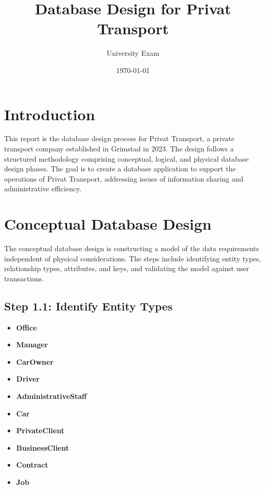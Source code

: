 \documentclass[a4paper,12pt]{article}
\title{Database Design for Privat Transport}
\author{University Exam}
\date{\today}
\begin{document}
\maketitle

\section*{Introduction}
This report is the database design process for Privat Transport, a private transport company established in Grimstad in 2023. The design follows a structured methodology comprising conceptual, logical, and physical database design phases. The goal is to create a database application to support the operations of Privat Transport, addressing issues of information sharing and administrative efficiency.

\section*{Conceptual Database Design}
The conceptual database design is constructing a model of the data requirements independent of physical considerations. The steps include identifying entity types, relationship types, attributes, and keys, and validating the model against user transactions.

\subsection*{Step 1.1: Identify Entity Types}
\begin{itemize}
    \item \textbf{Office}
    \item \textbf{Manager}
    \item \textbf{CarOwner}
    \item \textbf{Driver}
    \item \textbf{AdministrativeStaff}
    \item \textbf{Car}
    \item \textbf{PrivateClient}
    \item \textbf{BusinessClient}
    \item \textbf{Contract}
    \item \textbf{Job}
\end{itemize}
\end{document}
